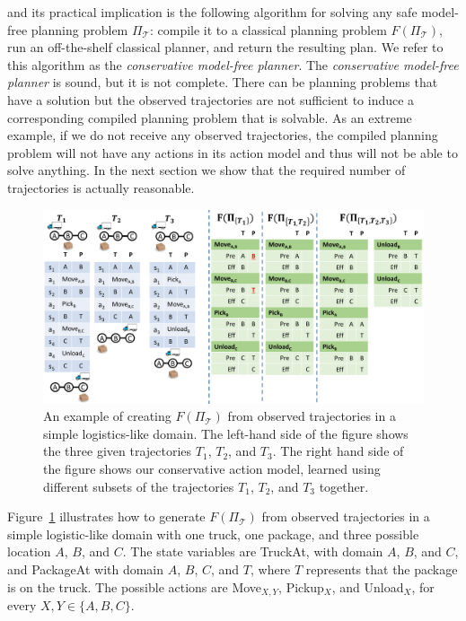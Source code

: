 \documentclass{article}
\newcommand{\cmfp}{safe model-free planning}
\begin{document}
	and its practical implication is the following algorithm for solving 
	any \cmfp{} problem $\Pi_\mathcal{T}$: compile it to a classical planning problem 
	$F(\Pi_\mathcal{T})$, run an off-the-shelf classical planner, and return the resulting plan. 
	We refer to this algorithm as the {\em conservative model-free planner}. 	
	The {\em conservative model-free planner} is sound, but it is not complete. 
	There can be planning problems 
	that have a solution but the observed trajectories are not sufficient 
	to induce a corresponding compiled planning problem that is solvable. 
	As an extreme example, if we do not receive any observed trajectories, 
	the compiled planning problem will not have any actions in its action model
	and thus will not be able to solve anything. 
	In the next section we show that the required number of trajectories is actually reasonable. 
	
	
	\begin{figure}
		\includegraphics[width=\textwidth]{example_cropped.pdf}
	\caption{An example of creating $F(\Pi_{\mathcal{T}})$ from observed trajectories in a simple logistics-like domain. The left-hand side of the figure shows the three given trajectories $T_1$, $T_2$, and $T_3$. The right hand side of the figure shows our conservative action model, 
		learned using different subsets of the trajectories $T_1$, $T_2$, and $T_3$ together.}
	\label{fig:example}
	\end{figure}
	
	
	
	Figure~\ref{fig:example} illustrates how to generate  $F(\Pi_{\mathcal{T}})$ from observed trajectories in a simple logistic-like domain with one truck, one package, and three possible location $A$, $B$, and $C$. The state variables are TruckAt, with domain $A$, $B$, and $C$, and PackageAt with domain $A$, $B$, $C$, and $T$, where $T$ represents that the package is on the truck. The possible actions are Move$_{X,Y}$, 
	Pickup$_X$, and Unload$_X$, for every $X,Y\in \{A,B,C\}$. 
	
\end{document}
